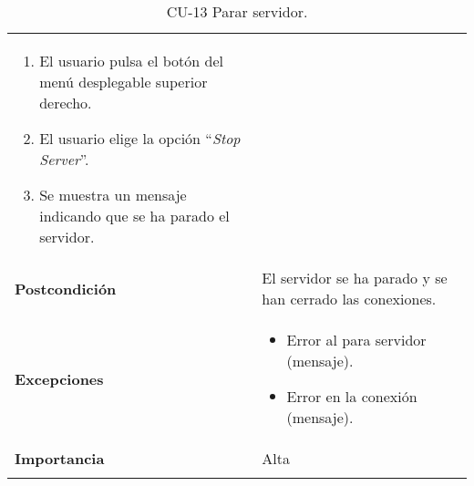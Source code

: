 \begin{longtable}[h!]{@{}ll@{}}
\begin{minipage}[t]{0.71\columnwidth}
\begin{enumerate}
\def\labelenumi{\arabic{enumi}.}
\tightlist
\item
  El usuario pulsa el botón del menú desplegable superior derecho.
\item
  El usuario elige la opción ``\textit{Stop Server}''.
\item
  Se muestra un mensaje indicando que se ha parado el servidor.
\end{enumerate}\strut
\end{minipage}\tabularnewline
\begin{minipage}[t]{0.23\columnwidth}\raggedright\strut
\textbf{Postcondición}\strut
\end{minipage} & \begin{minipage}[t]{0.71\columnwidth}\raggedright\strut
El servidor se ha parado y se han cerrado las conexiones.\strut
\end{minipage}\tabularnewline
\begin{minipage}[t]{0.23\columnwidth}\raggedright\strut
\textbf{Excepciones}\strut
\end{minipage} & \begin{minipage}[t]{0.71\columnwidth}\raggedright\strut
\begin{itemize}
\tightlist
\item
  Error al para servidor (mensaje).
\item
  Error en la conexión (mensaje).
\end{itemize}\strut
\end{minipage}\tabularnewline
\begin{minipage}[t]{0.23\columnwidth}\raggedright\strut
\textbf{Importancia}\strut
\end{minipage} & \begin{minipage}[t]{0.71\columnwidth}\raggedright\strut
Alta\strut
\end{minipage}\tabularnewline
\bottomrule
\caption{CU-13 Parar servidor.}
\end{longtable}


